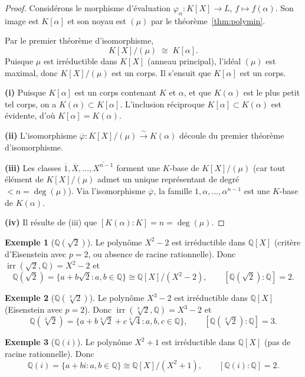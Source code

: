 \documentclass[12pt,a4paper,openany]{book}
\theoremstyle{definition}
\newtheorem{exemple}{Exemple}[chapter]
\newcommand{\Q}{\mathbb{Q}}
\newcommand{\irr}{\operatorname{irr}}
\renewcommand{\deg}{\operatorname{deg}}
\begin{document}
\begin{proof}
Considérons le morphisme d'évaluation
$\varphi_\alpha \colon K[X] \to L$, $f \mapsto f(\alpha)$. Son image est
$K[\alpha]$ et son noyau est $(\mu)$ par le théorème~\ref{thm:polymin}.

Par le premier théorème d'isomorphisme,
\[
  K[X]/(\mu) \;\cong\; K[\alpha].
\]
Puisque $\mu$ est irréductible dans $K[X]$ (anneau principal), l'idéal $(\mu)$
est maximal, donc $K[X]/(\mu)$ est un corps. Il s'ensuit que $K[\alpha]$ est un
corps.

\textbf{(i)} Puisque $K[\alpha]$ est un corps contenant $K$ et $\alpha$, et que
$K(\alpha)$ est le plus petit tel corps, on a $K(\alpha) \subset K[\alpha]$.
L'inclusion réciproque $K[\alpha] \subset K(\alpha)$ est évidente, d'où
$K[\alpha] = K(\alpha)$.

\textbf{(ii)} L'isomorphisme $\overline{\varphi} \colon K[X]/(\mu) \xrightarrow{\sim} K(\alpha)$
découle du premier théorème d'isomorphisme.

\textbf{(iii)} Les classes $\overline{1}, \overline{X}, \dots, \overline{X^{n-1}}$
forment une $K$-base de $K[X]/(\mu)$ (car tout élément de $K[X]/(\mu)$ admet un
unique représentant de degré $< n = \deg(\mu)$). Via l'isomorphisme
$\overline{\varphi}$, la famille $1, \alpha, \dots, \alpha^{n-1}$ est une $K$-base
de $K(\alpha)$.

\textbf{(iv)} Il résulte de (iii) que $[K(\alpha):K] = n = \deg(\mu)$.
\end{proof}

\begin{exemple}[$\Q(\sqrt{2})$]\label{ex:Q-sqrt2}
\index{Q(sqrt2)@$\Q(\sqrt{2})$}
Le polynôme $X^2 - 2$ est irréductible dans $\Q[X]$ (critère d'Eisenstein avec
$p = 2$, ou absence de racine rationnelle). Donc $\irr(\sqrt{2}, \Q) = X^2 - 2$
et
\[
  \Q(\sqrt{2}) = \{a + b\sqrt{2} : a, b \in \Q\} \cong \Q[X]/(X^2 - 2),
  \qquad [\Q(\sqrt{2}):\Q] = 2.
\]
\end{exemple}

\begin{exemple}[{$\Q(\sqrt[3]{2})$}]\label{ex:Q-cbrt2}
\index{Q(cbrt2)@$\Q(\sqrt[3]{2})$}
Le polynôme $X^3 - 2$ est irréductible dans $\Q[X]$ (Eisenstein avec $p = 2$).
Donc $\irr(\sqrt[3]{2}, \Q) = X^3 - 2$ et
\[
  \Q(\sqrt[3]{2}) = \{a + b\sqrt[3]{2} + c\sqrt[3]{4} : a, b, c \in \Q\},
  \qquad [\Q(\sqrt[3]{2}):\Q] = 3.
\]
\end{exemple}

\begin{exemple}[$\Q(i)$]\label{ex:Q-i}
\index{Q(i)@$\Q(i)$}
Le polynôme $X^2 + 1$ est irréductible dans $\Q[X]$ (pas de racine rationnelle).
Donc
\[
  \Q(i) = \{a + bi : a, b \in \Q\} \cong \Q[X]/(X^2+1), \qquad [\Q(i):\Q] = 2.
\]
\end{exemple}
\end{document}
